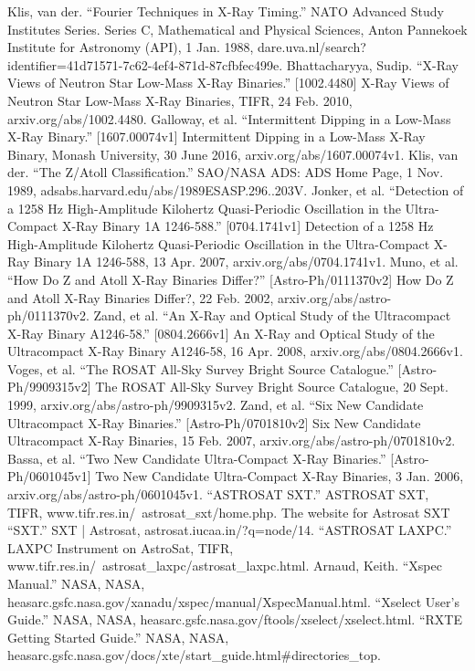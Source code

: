 \documentclass[a4paper,twoside]{report}
\numberwithin{equation}{section}
\begin{document}
\begin{thebibliography}{20}

Klis, van der. “Fourier Techniques in X-Ray Timing.” NATO Advanced Study Institutes Series. Series C, Mathematical and Physical Sciences, Anton Pannekoek Institute for Astronomy (API), 1 Jan. 1988, dare.uva.nl/search?identifier=41d71571-7c62-4ef4-871d-87cfbfec499e.
Bhattacharyya, Sudip. “X-Ray Views of Neutron Star Low-Mass X-Ray Binaries.” [1002.4480] X-Ray Views of Neutron Star Low-Mass X-Ray Binaries, TIFR, 24 Feb. 2010, arxiv.org/abs/1002.4480.
Galloway, et al. “Intermittent Dipping in a Low-Mass X-Ray Binary.” [1607.00074v1] Intermittent Dipping in a Low-Mass X-Ray Binary, Monash University, 30 June 2016, arxiv.org/abs/1607.00074v1.
Klis, van der. “The Z/Atoll Classification.” SAO/NASA ADS: ADS Home Page, 1 Nov. 1989, adsabs.harvard.edu/abs/1989ESASP.296..203V.
Jonker, et al. “Detection of a 1258 Hz High-Amplitude Kilohertz Quasi-Periodic Oscillation in the Ultra-Compact X-Ray Binary 1A 1246-588.” [0704.1741v1] Detection of a 1258 Hz High-Amplitude Kilohertz Quasi-Periodic Oscillation in the Ultra-Compact X-Ray Binary 1A 1246-588, 13 Apr. 2007, arxiv.org/abs/0704.1741v1.
Muno, et al. “How Do Z and Atoll X-Ray Binaries Differ?” [Astro-Ph/0111370v2] How Do Z and Atoll X-Ray Binaries Differ?, 22 Feb. 2002, arxiv.org/abs/astro-ph/0111370v2.
Zand, et al. “An X-Ray and Optical Study of the Ultracompact X-Ray Binary A1246-58.” [0804.2666v1] An X-Ray and Optical Study of the Ultracompact X-Ray Binary A1246-58, 16 Apr. 2008, arxiv.org/abs/0804.2666v1.
Voges, et al. “The ROSAT All-Sky Survey Bright Source Catalogue.” [Astro-Ph/9909315v2] The ROSAT All-Sky Survey Bright Source Catalogue, 20 Sept. 1999, arxiv.org/abs/astro-ph/9909315v2.
Zand, et al. “Six New Candidate Ultracompact X-Ray Binaries.” [Astro-Ph/0701810v2] Six New Candidate Ultracompact X-Ray Binaries, 15 Feb. 2007, arxiv.org/abs/astro-ph/0701810v2.
Bassa, et al. “Two New Candidate Ultra-Compact X-Ray Binaries.” [Astro-Ph/0601045v1] Two New Candidate Ultra-Compact X-Ray Binaries, 3 Jan. 2006, arxiv.org/abs/astro-ph/0601045v1.
“ASTROSAT SXT.” ASTROSAT SXT, TIFR, www.tifr.res.in/~astrosat\_sxt/home.php. The website for Astrosat SXT
“SXT.” SXT | Astrosat, astrosat.iucaa.in/?q=node/14.
“ASTROSAT LAXPC.” LAXPC Instrument on AstroSat, TIFR, www.tifr.res.in/~astrosat\_laxpc/astrosat\_laxpc.html.
Arnaud, Keith. “Xspec Manual.” NASA, NASA, heasarc.gsfc.nasa.gov/xanadu/xspec/manual/XspecManual.html.
“Xselect User's Guide.” NASA, NASA, heasarc.gsfc.nasa.gov/ftools/xselect/xselect.html.
“RXTE Getting Started Guide.” NASA, NASA, heasarc.gsfc.nasa.gov/docs/xte/start\_guide.html\#directories\_top.



\end{thebibliography}
\end{document}
